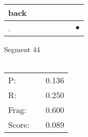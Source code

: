 \documentclass[landscape]{article}
\newcommand{\ssp}{\hspace{2pt}}
\newcommand{\mex}{\cellcolor{g}$\bullet$}
\begin{document}
\begin{tabular}{|l|p{10pt}|p{10pt}|p{10pt}|p{10pt}|p{10pt}|p{10pt}|}
\hline
\ssp back \ssp&\hspace{2pt}&\hspace{2pt}&\hspace{2pt}&\hspace{2pt}&\hspace{2pt}&\hspace{2pt}\\
\hline
\ssp \cellcolor{ref5}. \ssp&\hspace{2pt}&\hspace{2pt}&\hspace{2pt}&\hspace{2pt}&\hspace{2pt}&\hspace{2pt}\mex\\
\hline
\end{tabular}

\vspace{6pt}
\noindent Segment 44\\\\
\noindent\begin{tabular}{lm{12pt}r}
\hline
P:&&0.136\\
R:&&0.250\\
Frag:&&0.600\\
Score:&&0.089\\
\end{tabular}

\newpage
\end{document}
